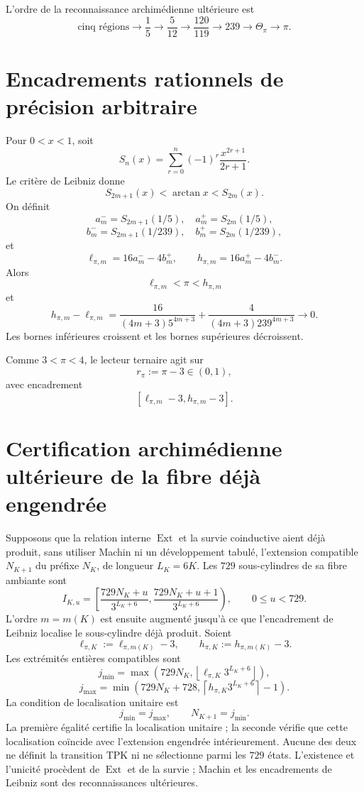 L’ordre de la reconnaissance archimédienne ultérieure est
\[
 \text{cinq régions}
 \to\frac15
 \to\frac5{12}
 \to\frac{120}{119}
 \to239
 \to\Theta_\pi
 \to\pi.
\]

\section{Encadrements rationnels de précision arbitraire}

Pour \(0<x<1\), soit
\[
 S_n(x)=\sum_{r=0}^{n}(-1)^r\frac{x^{2r+1}}{2r+1}.
\]
Le critère de Leibniz donne
\[
 S_{2m+1}(x)<\arctan x<S_{2m}(x).
\]
On définit
\[
 a_m^-=S_{2m+1}(1/5),\quad a_m^+=S_{2m}(1/5),
\]
\[
 b_m^-=S_{2m+1}(1/239),\quad b_m^+=S_{2m}(1/239),
\]
et
\begin{equation}
 \ell_{\pi,m}=16a_m^- -4b_m^+,
 \qquad
 h_{\pi,m}=16a_m^+ -4b_m^-.
 \label{gfp:b:eq:horquilla-pi-autonoma}
\end{equation}
Alors
\[
 \ell_{\pi,m}<\pi<h_{\pi,m}
\]
et
\begin{equation}
 h_{\pi,m}-\ell_{\pi,m}
 =
 \frac{16}{(4m+3)5^{4m+3}}
 +\frac{4}{(4m+3)239^{4m+3}}
 \longrightarrow0.
 \label{gfp:b:eq:anchura-horquilla-pi}
\end{equation}
Les bornes inférieures croissent et les bornes supérieures décroissent.

Comme \(3<\pi<4\), le lecteur ternaire agit sur
\[
 r_\pi:=\pi-3\in(0,1),
\]
avec encadrement
\[
 [\ell_{\pi,m}-3,h_{\pi,m}-3].
\]

\section{Certification archimédienne ultérieure de la fibre déjà engendrée}

Supposons que la relation interne \(\operatorname{Ext}\) et la survie
coinductive aient déjà produit, sans utiliser Machin ni un développement tabulé,
l’extension compatible \(N_{K+1}\) du préfixe \(N_K\), de longueur
\(L_K=6K\). Les \(729\) sous-cylindres de sa fibre ambiante sont
\[
 I_{K,u}=
 \left[
 \frac{729N_K+u}{3^{L_K+6}},
 \frac{729N_K+u+1}{3^{L_K+6}}
 \right),
 \qquad0\leq u<729.
\]
L’ordre \(m=m(K)\) est ensuite augmenté jusqu’à ce que l’encadrement de Leibniz
localise le sous-cylindre déjà produit. Soient
\[
 \ell_{\pi,K}:=\ell_{\pi,m(K)}-3,
 \qquad
 h_{\pi,K}:=h_{\pi,m(K)}-3.
\]
Les extrémités entières compatibles sont
\[
 j_{\min}=
 \max\!\left(
 729N_K,\left\lfloor
 \ell_{\pi,K}3^{L_K+6}\right\rfloor
 \right),
\]
\[
 j_{\max}=
 \min\!\left(
 729N_K+728,\left\lceil
 h_{\pi,K}3^{L_K+6}\right\rceil-1
 \right).
\]
La condition de localisation unitaire est
\begin{equation}
 \boxed{j_{\min}=j_{\max},\qquad N_{K+1}=j_{\min}.}
 \label{gfp:b:eq:seleccion-unitaria-subcilindro-pi}
\end{equation}
La première égalité certifie la localisation unitaire ; la seconde vérifie
que cette localisation coïncide avec l’extension engendrée intérieurement. Aucune
des deux ne définit la transition TPK ni ne sélectionne parmi les \(729\) états.
L’existence et l’unicité procèdent de \(\operatorname{Ext}\) et de la
survie ; Machin et les encadrements de Leibniz sont des reconnaissances
ultérieures.

